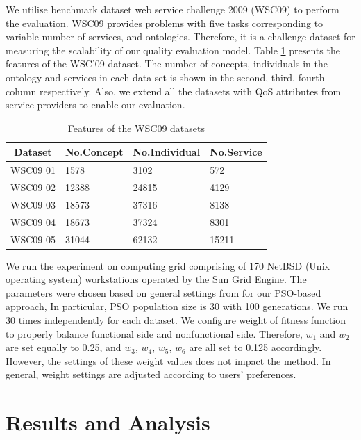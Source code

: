 \documentclass{IEEEtran}
\begin{document}
We utilise benchmark dataset web service challenge 2009 (WSC09) \cite{kona2009wsc} to perform the evaluation. WSC09 provides problems with five tasks corresponding to variable number of services, and ontologies. Therefore, it is a challenge dataset for measuring the scalability of our quality evaluation model. Table \ref{wsc09datasetTable} presents the features of the WSC’09 dataset. The number of concepts, individuals in the ontology and services in each data set is shown in the second, third, fourth column respectively. Also, we extend all the datasets with QoS attributes from service providers to enable our evaluation. 

\begin{table}[]
\centering
\caption{Features of the WSC09 datasets}
\label{wsc09datasetTable}
\begin{tabular}{l|l|l|l}
\hline
\multicolumn{1}{c|}{Dataset} & No.Concept & No.Individual & No.Service \\ \hline
WSC09 01                     & 1578       &3102           &572      \\ \hline
WSC09 02                     & 12388      &24815          &4129      \\ \hline
WSC09 03                     & 18573      &37316          &8138      \\ \hline
WSC09 04                     & 18673      &37324          &8301      \\ \hline
WSC09 05                     & 31044      &62132          &15211    \\ \hline
\end{tabular}
\end{table}

We run the experiment on computing grid comprising of 170 NetBSD (Unix operating system) workstations operated by the Sun Grid Engine. The parameters were chosen based on general settings from \cite{shi2001particle} for our PSO-based approach, In particular, PSO population size is 30 with 100 generations. We run 30 times independently for each dataset. We configure weight of fitness function to properly balance functional side and nonfunctional side. Therefore, $w_{1}$ and $w_{2}$ are set equally to 0.25, and $w_{3}$, $w_{4}$, $w_{5}$, $w_{6}$ are all set to 0.125 accordingly. However, the settings of these weight values does not impact the method. In general, weight settings are adjusted according to users' preferences.


\section{Results and Analysis}\label{results_analysis}
\end{document}

